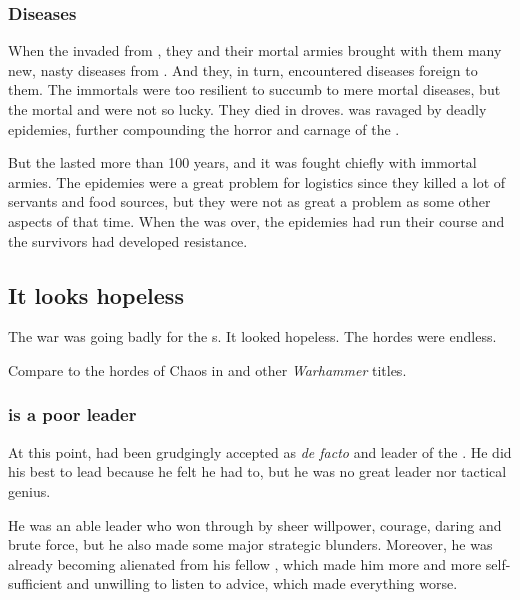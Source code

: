 \subsubsection{Diseases}
When the \resphain invaded from \Nyx, they and their mortal armies brought with them many new, nasty diseases from \Nyx.
And they, in turn, encountered \Tembraean diseases foreign to them.
The immortals were too resilient to succumb to mere mortal diseases, but the mortal \Tembraeans and \Nyxians were not so lucky.
They died in droves.
\Tembrae was ravaged by deadly epidemies, further compounding the horror and carnage of the \secondbanewar.

But the \secondbanewar lasted more than 100 years, and it was fought chiefly with immortal armies.
The epidemies were a great problem for logistics since they killed a lot of servants and food sources, but they were not as great a problem as some other aspects of that time.
When the \secondbanewar was over, the epidemies had run their course and the survivors had developed resistance.









\subsection{It looks hopeless}
The war was going badly for the \Miithian s. 
It looked hopeless. 
The \bane{} hordes were endless. 

Compare to the hordes of Chaos in \cite{RPG:Warhammer:HighElves} and other \emph{Warhammer} titles. 




\subsubsection{\Ishnaruchaefir is a poor leader}
At this point, \Ishnaruchaefir{} had been grudgingly accepted as \emph{de facto} \dragonlord{} and leader of the \dragons.
He did his best to lead because he felt he had to, but he was no great leader nor tactical genius. 

He was an able leader who won through by sheer willpower, courage, daring and brute force, but he also made some major strategic blunders. 
Moreover, he was already becoming alienated from his fellow \dragons{}, which made him more and more self-sufficient and unwilling to listen to advice, which made everything worse. 





